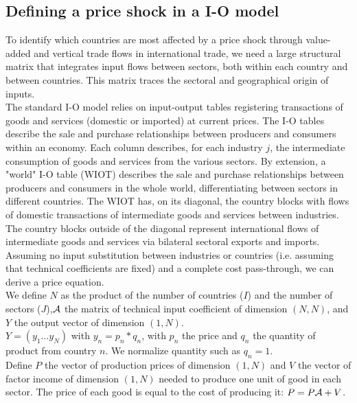 \documentclass[11pt,a4paper]{article}
\begin{document}
\subsection{Defining a price shock in a I-O model}\label{subsec:ioprice}
To identify which countries are most affected by a price shock through value-added and vertical trade flows in international trade, we need a large structural matrix that integrates input flows between sectors, both within each country and between countries.
This matrix traces the sectoral and geographical origin of inputs. \\
The standard I-O model relies on input-output tables registering transactions of goods and services (domestic or imported) at current prices. The I-O tables describe the sale and purchase relationships between producers and consumers within an economy. Each column describes, for each industry $j$, the intermediate consumption of goods and services from the various sectors.
By extension, a "world" I-O table (WIOT) describes the sale and purchase relationships between producers and consumers in the whole world, differentiating between sectors in different countries.
The WIOT has, on its diagonal, the country blocks with flows of domestic transactions of intermediate goods and services between industries.
The country blocks outside of the diagonal represent international flows of intermediate goods and services via bilateral sectoral exports and imports. \\
Assuming no input substitution between industries or countries (i.e. assuming that technical coefficients are fixed) and a complete cost pass-through, we can derive a price equation.\\
We define $N$ as the product of the number of countries ($I$) and the number of sectors ($J$),$\cal A$ the matrix of technical input coefficient of dimension $(N, N)$, and $Y$ the output vector of dimension $(1, N)$. \\
$Y=(y_1\ldots y_N)$ with $y_n=p_n*q_n$, with $p_n$ the price and $q_n$ the quantity of product from country $n$. We normalize quantity such as $q_n=1$. \\
Define $P$ the vector of production prices of dimension $(1, N)$ and $V$ the vector of factor income of dimension $(1, N)$ needed to produce one unit of good in each sector. The price of each good is equal to the cost of producing it: $P=P{\cal A}+V$. \\
\end{document}
